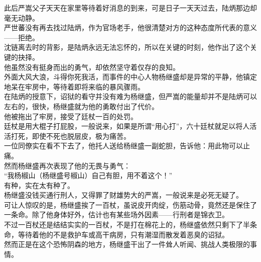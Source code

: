 \begin{multicols}{\theparacolNo}
此后严嵩父子天天在家里等待着好消息的到来，可是日子一天天过去，陆炳那边却毫无动静。\\

严世蕃没有再去找过陆炳，作为官场老手，他很清楚对方的这种态度所代表的意义——拒绝。\\

沈链离去时的背影，是陆炳永远无法忘怀的，所以在关键的时刻，他作出了这个关键的抉择。\\

他虽然没有挺身而出的勇气，却依然坚守着仅存的良知。\\

外面大风大浪，斗得你死我活，而事件的中心人物杨继盛却是异常的平静，他镇定地呆在牢房中，等待着即将来临的暴风骤雨。\\

在陆炳的授意下，诏狱的看守并没有难为杨继盛，但严嵩的能量却并不是陆炳可以左右的，很快，杨继盛就为他的勇敢付出了代价。\\

他被拖出了牢房，接受了廷杖一百的处罚。\\

廷杖是用大棍子打屁股，一般说来，如果是所谓“用心打”，六十廷杖就足以将人活活打死，即使不死也脱层皮，极为痛苦。\\

一位同僚实在看不下去了，他托人送给杨继盛一副蛇胆，告诉他：用此物可以止痛。\\

然而杨继盛再次表现了他的无畏与勇气：\\

“我杨椒山（杨继盛号椒山）自己有胆，用不着这个！”\\

有种，实在太有种了。\\

杨继盛没钱买通行刑人，又得罪了财雄势大的严嵩，一般说来是必死无疑了。\\

可让人惊叹的是，杨继盛挨了一百杖，虽说皮开肉绽，伤筋动骨，竟然还是保住了一条命。除了他身体好外，估计也有某些场外因素——行刑者是锦衣卫。\\

不过一百杖还是结结实实的一百杖，不是打在棉花上的，杨继盛依然只剩下了半条命，等待着他的不是救护车或高干病房，只有潮湿而散发着恶臭的诏狱。\\

然而正是在这个恐怖阴森的地方，杨继盛干出了一件耸人听闻、挑战人类极限的事情。\\


\end{multicols}
